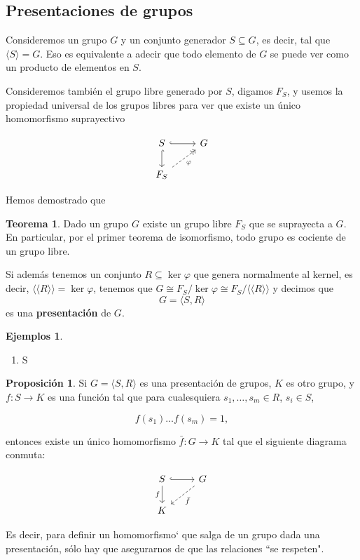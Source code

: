 \documentclass[spanish]{book}
\theoremstyle{definition}
\newtheorem*{teo}{Teorema}
\newtheorem*{prop}{Proposición}
\newtheorem*{ejems}{Ejemplos}
\begin{document}
\subsection{Presentaciones de grupos}
	Consideremos un grupo $G$ y un conjunto generador $S\subseteq G$, es decir, tal que $\langle S\rangle=G$. Eso es equivalente a adecir que todo elemento de $G$ se puede ver como un producto de elementos en $S$.
	
	Consideremos también el grupo libre generado por $S$, digamos $F_S$, y usemos la propiedad universal de los grupos libres para ver que existe un único homomorfismo suprayectivo

	\[\begin{tikzcd}
		S\arrow[r,hook]\arrow[d,hook]&G\\
		F_S\arrow[ur,->>,dashed,swap,"\varphi"]
	\end{tikzcd}\]

	Hemos demostrado que
	
	\begin{teo}
		Dado un grupo $G$ existe un grupo libre $F_S$ que se suprayecta a $G$. En particular, por el primer teorema de isomorfismo, todo grupo es cociente de un grupo libre.
	\end{teo}
	
	Si además tenemos un conjunto $R\subseteq\ker\varphi$ que genera normalmente al kernel, es decir, $\langle\langle R\rangle\rangle =\ker\varphi$, tenemos que $G\cong F_S/\ker\varphi\cong F_S/\langle\langle R\rangle\rangle$ y decimos que
	\[G=\langle S,R\rangle\]
	es una \textbf{presentación} de $G$.
	
	\begin{ejems}
		\begin{enumerate}
			\item S
		\end{enumerate}
	\end{ejems}
	
	\begin{prop}
		Si $G=\langle S,R\rangle$ es una presentación de grupos, $K$ es otro grupo, y $f:S\to K$ es una función tal que para cualesquiera $s_1,\ldots,s_m\in R$, $s_i\in S$,
		
		\[f(s_1)\ldots f(s_m)=1,\]
		
		entonces existe un único homomorfismo $\bar{f}:G\to K$ tal que el siguiente diagrama conmuta:
		
		\[\begin{tikzcd}
			S\arrow[r,hook]\arrow[d,swap,"f"]&G\arrow[dl,dashed,"\bar{f}"]\\
			K
		\end{tikzcd}\]
	\end{prop}
	Es decir, para definir un homomorfismo` que salga de un grupo dada una presentación, sólo hay que asegurarnos de que las relaciones ``se respeten".
\end{document}
